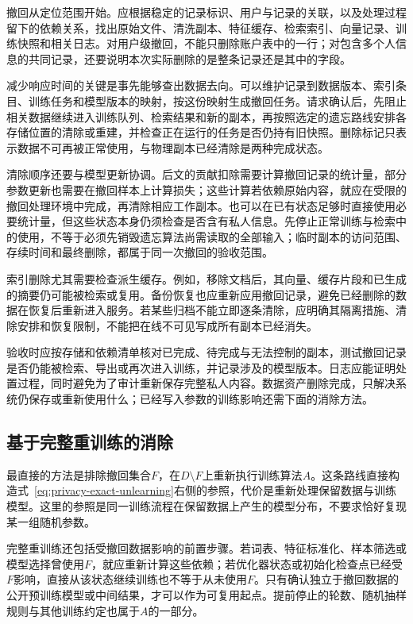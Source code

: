撤回从定位范围开始。应根据稳定的记录标识、用户与记录的关联，以及处理过程留下的依赖关系，找出原始文件、清洗副本、特征缓存、检索索引、向量记录、训练快照和相关日志。对用户级撤回，不能只删除账户表中的一行；对包含多个人信息的共同记录，还要说明本次实际删除的是整条记录还是其中的字段。

减少响应时间的关键是事先能够查出数据去向。可以维护记录到数据版本、索引条目、训练任务和模型版本的映射，按这份映射生成撤回任务。请求确认后，先阻止相关数据继续进入训练队列、检索结果和新的副本，再按照选定的遗忘路线安排各存储位置的清除或重建，并检查正在运行的任务是否仍持有旧快照。删除标记只表示数据不可再被正常使用，与物理副本已经清除是两种完成状态。

清除顺序还要与模型更新协调。后文的贡献扣除需要计算撤回记录的统计量，部分参数更新也需要在撤回样本上计算损失；这些计算若依赖原始内容，就应在受限的撤回处理环境中完成，再清除相应工作副本。也可以在已有状态足够时直接使用必要统计量，但这些状态本身仍须检查是否含有私人信息。先停止正常训练与检索中的使用，不等于必须先销毁遗忘算法尚需读取的全部输入；临时副本的访问范围、存续时间和最终删除，都属于同一次撤回的验收范围。

索引删除尤其需要检查派生缓存。例如，移除文档后，其向量、缓存片段和已生成的摘要仍可能被检索或复用。备份恢复也应重新应用撤回记录，避免已经删除的数据在恢复后重新进入服务。若某些归档不能立即逐条清除，应明确其隔离措施、清除安排和恢复限制，不能把在线不可见写成所有副本已经消失。

验收时应按存储和依赖清单核对已完成、待完成与无法控制的副本，测试撤回记录是否仍能被检索、导出或再次进入训练，并记录涉及的模型版本。日志应能证明处置过程，同时避免为了审计重新保存完整私人内容。数据资产删除完成，只解决系统仍保存或重新使用什么；已经写入参数的训练影响还需下面的消除方法。

\subsection{基于完整重训练的消除}
\label{sec:privacy-unlearning-full-retrain}

最直接的方法是排除撤回集合$F$，在$D\setminus F$上重新执行训练算法$A$。这条路线直接构造式~\eqref{eq:privacy-exact-unlearning}右侧的参照，代价是重新处理保留数据与训练模型。这里的参照是同一训练流程在保留数据上产生的模型分布，不要求恰好复现某一组随机参数。

完整重训练还包括受撤回数据影响的前置步骤。若词表、特征标准化、样本筛选或模型选择曾使用$F$，就应重新计算这些依赖；若优化器状态或初始化检查点已经受$F$影响，直接从该状态继续训练也不等于从未使用$F$。只有确认独立于撤回数据的公开预训练模型或中间结果，才可以作为可复用起点。提前停止的轮数、随机抽样规则与其他训练约定也属于$A$的一部分。

